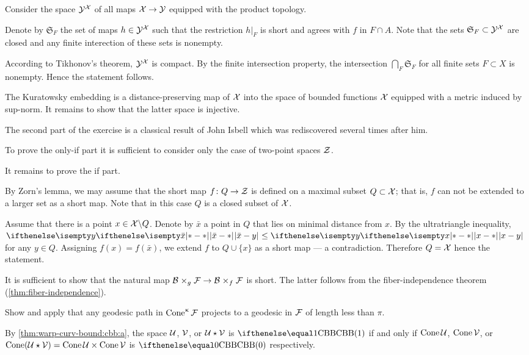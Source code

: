  Consider the space $\mathcal{Y}^{\mathcal{X}}$ of all maps $\spc{X}\to \spc{Y}$ equipped with the product topology.

Denote by $\mathfrak{S}_F$ the set of maps $h\in \spc{Y}^\spc{X}$ such that the restriction $h|_F$  is short and agrees with $f$ in $F\cap A$.
Note that the sets $\mathfrak{S}_F\subset \spc{Y}^\spc{X}$ are closed and any finite interection of these sets is nonempty.

According to Tikhonov's theorem, $\mathcal{Y}^{\mathcal{X}}$ is compact.
By the finite intersection property, the intersection $\bigcap_F\mathfrak{S}_F$ for all finite sets $F\subset X$ is nonempty.
Hence the statement follows.

The Kuratowsky embedding is a distance-preserving map of $\mathcal{X}$ into the space of bounded functions $\mathcal{X}$ equipped with a metric induced by sup-norm.
It remains to show that the latter space is injective.

The second part of the exercise is a classical result of John Isbell \cite{isbell} which was rediscovered several times after him.

To prove the only-if part it is sufficient to consider only the case of two-point spaces $\mathcal{Z}$.

It remains to prove the if part.

By Zorn's lemma, we may assume that the short map $f\:Q\to \spc{Z}$ is defined on a maximal subset $Q\subset \spc{X}$;
that is, $f$ can not be extended to a larger set as a short map.
Note that in this case $Q$ is a closed subset of $\mathcal{X}$.

Assume that there is a point $x\in \spc{X}\backslash Q$.
Denote by $\bar x$ a point in $Q$ that lies on minimal distance from $x$.
By the ultratriangle inequality, $\dist{\bar x}{y}{}\le\dist{x}{y}{}$ for any $y\in Q$.
Assigning $f(x)=f(\bar x)$, we extend $f$ to $Q\cup\{x\}$ as a short map --- a contradiction.
Therefore $Q=\mathcal{X}$ hence the statement.


It is sufficient to show that the natural map $\spc{B}\warp{g}\spc{F}\to \spc{B}\warp{f}\spc{F}$ is short.
The latter follows from the fiber-independence theorem (\ref{thm:fiber-independence}).

Show and apply that any geodesic path in $\mathop{\rm Cone}\nolimits^\upkappa\mathcal{F}$ projects to a geodesic in $\mathcal{F}$ of length less than $\pi$.

By \ref{thm:warp-curv-bound:cbb:a}, the space $\mathcal{U}$, $\mathcal{V}$, or $\mathcal{U}\star\mathcal{V}$ is $\Alex1$ if and only if $\mathop{\rm Cone}\nolimits\mathcal{U}$, $\mathop{\rm Cone}\nolimits\mathcal{V}$, or $\Cone(\spc{U}\star\spc{V})=\Cone\spc{U}\times\Cone\spc{V}$ is $\Alex0$ respectively.

